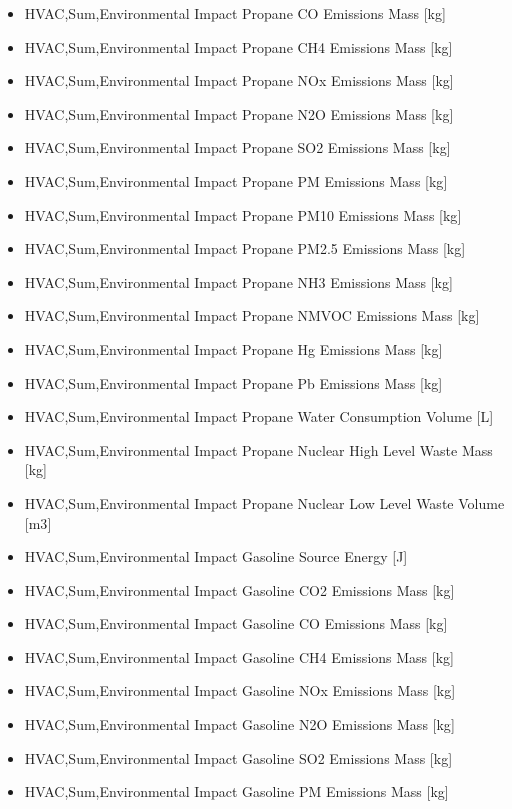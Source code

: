 \begin{itemize}
\item
  HVAC,Sum,Environmental Impact Propane CO Emissions Mass {[}kg{]}
\item
  HVAC,Sum,Environmental Impact Propane CH4 Emissions Mass {[}kg{]}
\item
  HVAC,Sum,Environmental Impact Propane NOx Emissions Mass {[}kg{]}
\item
  HVAC,Sum,Environmental Impact Propane N2O Emissions Mass {[}kg{]}
\item
  HVAC,Sum,Environmental Impact Propane SO2 Emissions Mass {[}kg{]}
\item
  HVAC,Sum,Environmental Impact Propane PM Emissions Mass {[}kg{]}
\item
  HVAC,Sum,Environmental Impact Propane PM10 Emissions Mass {[}kg{]}
\item
  HVAC,Sum,Environmental Impact Propane PM2.5 Emissions Mass {[}kg{]}
\item
  HVAC,Sum,Environmental Impact Propane NH3 Emissions Mass {[}kg{]}
\item
  HVAC,Sum,Environmental Impact Propane NMVOC Emissions Mass {[}kg{]}
\item
  HVAC,Sum,Environmental Impact Propane Hg Emissions Mass {[}kg{]}
\item
  HVAC,Sum,Environmental Impact Propane Pb Emissions Mass {[}kg{]}
\item
  HVAC,Sum,Environmental Impact Propane Water Consumption Volume {[}L{]}
\item
  HVAC,Sum,Environmental Impact Propane Nuclear High Level Waste Mass {[}kg{]}
\item
  HVAC,Sum,Environmental Impact Propane Nuclear Low Level Waste Volume {[}m3{]}
\item
  HVAC,Sum,Environmental Impact Gasoline Source Energy {[}J{]}
\item
  HVAC,Sum,Environmental Impact Gasoline CO2 Emissions Mass {[}kg{]}
\item
  HVAC,Sum,Environmental Impact Gasoline CO Emissions Mass {[}kg{]}
\item
  HVAC,Sum,Environmental Impact Gasoline CH4 Emissions Mass {[}kg{]}
\item
  HVAC,Sum,Environmental Impact Gasoline NOx Emissions Mass {[}kg{]}
\item
  HVAC,Sum,Environmental Impact Gasoline N2O Emissions Mass {[}kg{]}
\item
  HVAC,Sum,Environmental Impact Gasoline SO2 Emissions Mass {[}kg{]}
\item
  HVAC,Sum,Environmental Impact Gasoline PM Emissions Mass {[}kg{]}

\end{itemize}

